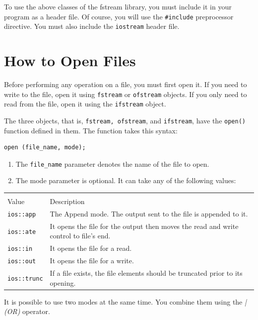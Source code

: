 \documentclass{book}
\begin{document}
To use the above classes of the fstream library, you must include it in your program as a header file. Of course, you will use the \texttt{#include} preprocessor directive. You must also include the \texttt{iostream} header file.

\section{How to Open Files}

Before performing any operation on a file, you must first open it. If you need to write to the file, open it using \texttt{fstream} or \texttt{ofstream} objects. If you only need to read from the file, open it using the \texttt{ifstream} object.

The three objects, that is, \texttt{fstream, ofstream}, and \texttt{ifstream}, have the \texttt{open()} function defined in them. The function takes this syntax:

\begin{lstlisting}
open (file_name, mode);
\end{lstlisting}

\begin{enumerate}
	\item The \texttt{file\_name} parameter denotes the name of the file to open.
\item The mode parameter is optional. It can take any of the following values:
\end{enumerate}

\begin{table}
\tiny
\begin{tabular}{ll} \hline \\
Value	& Description \\ \hline 
\texttt{ios::app}	& The Append mode. The output sent to the file is appended to it. \\
\texttt{ios::ate}	& It opens the file for the output then moves the read and write control to file’s end. \\
\texttt{ios::in}	& It opens the file for a read. \\
\texttt{ios::out}	& It opens the file for a write. \\
\texttt{ios::trunc}	& If a file exists, the file elements should be truncated prior to its opening. \\ \hline
\end{tabular}
\end{table}
\normalsize

It is possible to use two modes at the same time. You combine them using the \textit{| (OR)} operator.
\end{document}
